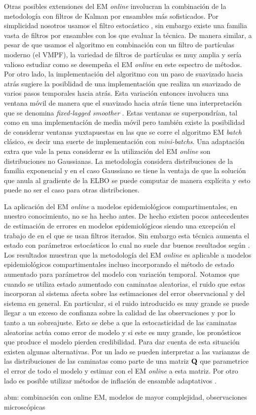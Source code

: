 Otras posibles extensiones del EM \textit{online} involucran la combinación de la metodología con filtros de Kalman por ensambles más sofisticados. Por simplicidad nosotros usamos el filtro estocástico \citep{Burgers1998}, sin embargo existe una familia vasta de filtros por ensambles con los que evaluar la técnica. De manera similar, a pesar de que usamos el algoritmo en combinación con un filtro de partículas moderno (el VMPF), la variedad de filtros de partículas es muy amplia y sería valioso estudiar como se desempeña el EM \textit{online} en este espectro de métodos. Por otro lado, la implementación del algoritmo con un paso de suavizado hacia atrás sugiere la posiblidad de una implementación que realiza un suavizado de varios pasos temporales hacia atrás. Esta variación entonces involucra una ventana móvil de manera que el suavizado hacia atrás tiene una interpretación que se denomina \textit{fixed-lagged smoother} \citep{Cosme2012}. Estas ventanas se superpondrían, tal como en una implementación de media móvil pero también existe la posibilidad de considerar ventanas yuxtapuestas en las que se corre el algoritmo EM \textit{batch} clásico, es decir una suerte de implementación con \textit{mini-batchs}. Una adaptación extra que vale la pena considerar es la utilización del EM \textit{online} son distribuciones no Gaussianas. La metodología considera distribuciones de la familia exponencial y en el caso Gaussiano se tiene la ventaja de que la solución que anula al gradiente de la ELBO se puede computar de manera explícita y esto puede no ser el caso para otras distribciones.

La aplicación del EM \textit{online} a modelos epidemiológicos compartimentales, en nuestro conocimiento, no se ha hecho antes. De hecho existen pocos antecedentes de estimación de errores en modelos epidemiológicos siendo una excepción el trabajo de \cite{Ionides2006} en el que se usan filtros iterados. Sin embargo esta técnica aumenta el estado con parámetros estocásticos lo cual no suele dar buenos resultados según \cite{Delsole2010}. Los resultados muestran que la metodología del EM \textit{online} es aplicable a modelos epidemiológicos compartimentales incluso incorporando el método de estado aumentado para parámetros del modelo con variación temporal. Notamos que cuando se utiliza estado aumentado con caminatas aleatorias, el ruido que estas incorporan al sistema afecta sobre las estimaciones del error observacional y del sistema en general. En particular, si el ruido introducido es muy grande se puede llegar a un exceso de confianza sobre la calidad de las observaciones y por lo tanto a un sobreajuste. Esto se debe a que la estocasticidad de las caminatas aleatorias actúa como error de modelo y si este es muy grande, los pronósticos que produce el modelo pierden credibilidad. Para dar cuenta de esta situación existen algunas alternativas. Por un lado se pueden interpretar a las varianzas de las distribuciones de las caminatas como parte de una matriz $\mathbf{Q}$ que parametrice el error de todo el modelo y estimar con el EM \textit{online} a esta matriz. Por otro lado es posible utilizar métodos de inflación de ensamble adaptativos \citep{Ruiz2013b}.



abm: combinación con online EM, modelos de mayor complejidad, observaciones microscópicas
